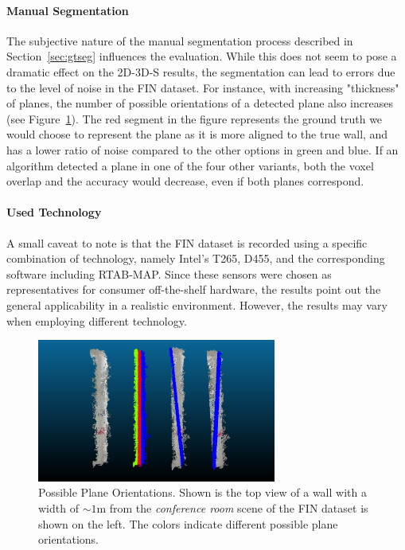 \documentclass[main.tex]{subfiles}
\begin{document}
\paragraph{Manual Segmentation}
The subjective nature of the manual segmentation process described in Section~\ref{sec:gtseg} influences the evaluation. While this does not seem to pose a dramatic effect on the 2D-3D-S results, the segmentation can lead to errors due to the level of noise in the FIN dataset. For instance, with increasing "thickness" of planes, the number of possible orientations of a detected plane also increases (see Figure~\ref{fig:poss-planes}). The red segment in the figure represents the ground truth we would choose to represent the plane as it is more aligned to the true wall, and has a lower ratio of noise compared to the other options in green and blue. If an algorithm detected a plane in one of the four other variants, both the voxel overlap and the accuracy would decrease, even if both planes correspond.

\clearpage
\paragraph{Used Technology}
A small caveat to note is that the FIN dataset is recorded using a specific combination of technology, namely Intel's T265, D455, and the corresponding software including RTAB-MAP.
Since these sensors were chosen as representatives for consumer off-the-shelf hardware, the results point out the general applicability in a realistic environment. However, the results may vary when employing different technology. 


\begin{figure}[H]
    \centering
    \includegraphics[width=0.7\textwidth]{images/possible_planes.png}
    \caption[Plane Orientation Ambiguity]{Possible Plane Orientations. Shown is the top view of a wall with a width of ${\sim}1$m from the \textit{conference room} scene of the FIN dataset is shown on the left. The colors indicate different possible plane orientations.}
    \label{fig:poss-planes}
\end{figure}
\end{document}
